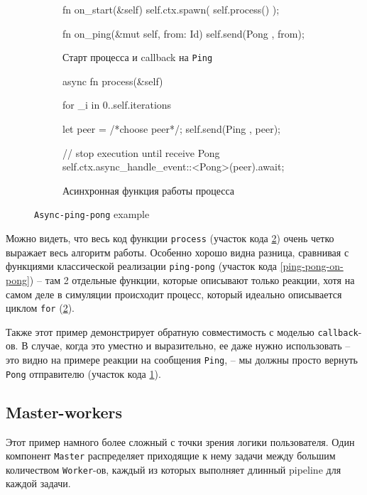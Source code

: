 \begin{figure}[H]
    \centering
    \begin{subfigure}[b]{0.45\linewidth}
        \footnotesize
        \centering
        \begin{rustcode}
fn on_start(&self) {
  self.ctx.spawn(
    self.process()
  );
}

fn on_ping(&mut self, from: Id) {
  self.send(Pong {}, from);
}    
    \end{rustcode}
        \caption{Старт процесса и callback на \texttt{Ping}}
        \label{start-async-ping-pong}
    \end{subfigure}
    \hfill
    \begin{subfigure}[b]{0.54\linewidth}
        \footnotesize
        \centering
        \begin{rustcode}
async fn process(&self) {
  for _i in 0..self.iterations {
    let peer = /*choose peer*/;
    self.send(Ping {}, peer);

    // stop execution until receive Pong
    self.ctx.async_handle_event::<Pong>(peer).await;
  }
}
    \end{rustcode}
    \caption{Асинхронная функция работы процесса}
    \label{async-ping-pong-action}
\end{subfigure}
\caption{\texttt{Async-ping-pong} example}
\label{async-ping-pong-code}
\end{figure}

Можно видеть, что весь код функции \texttt{process} (участок кода \ref{async-ping-pong-action}) очень четко выражает весь алгоритм работы. Особенно хорошо видна разница, сравнивая с функциями классической реализации \texttt{ping-pong} (участок кода \ref{ping-pong-on-pong}) -- там 2 отдельные функции, которые описывают только реакции, хотя на самом деле в симуляции происходит процесс, который идеально описывается циклом \texttt{for} (\ref{async-ping-pong-action}). 

Также этот пример демонстрирует обратную совместимость с моделью \texttt{callback}-ов. В случае, когда это уместно и выразительно, ее даже нужно использовать -- это видно на примере реакции на сообщения \texttt{Ping}, -- мы должны просто вернуть \texttt{Pong} отправителю (участок кода \ref{start-async-ping-pong}). 

\subsection{Master-workers}

Этот пример намного более сложный с точки зрения логики пользователя. Один компонент \texttt{Master} распределяет приходящие к нему задачи между большим количеством \texttt{Worker}-ов, каждый из которых выполняет длинный pipeline для каждой задачи. 

